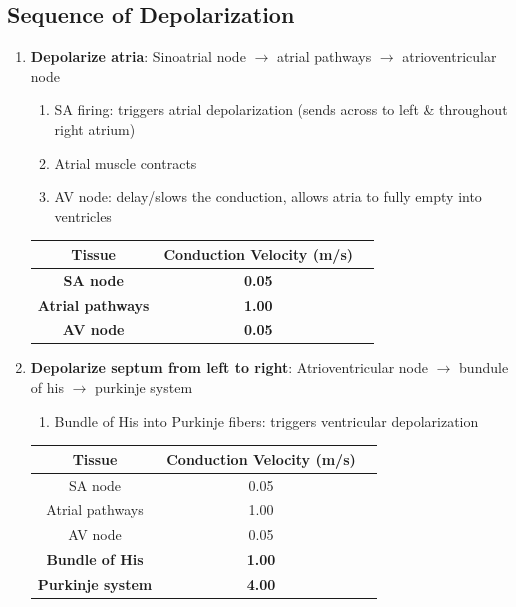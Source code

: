 \documentclass[11pt,fleqn]{book} %
\begin{document}
\subsection{Sequence of Depolarization}
\begin{enumerate}
    \item \textbf{Depolarize atria}: Sinoatrial node $\rightarrow$ atrial pathways $\rightarrow$ atrioventricular node
    \begin{enumerate}[start=1]
        \item SA firing: triggers atrial
depolarization (sends
across to left \& throughout
right atrium)
        \item Atrial muscle contracts
        \item AV node: delay/slows
the conduction, allows
atria to fully empty into
ventricles
    \end{enumerate}

\begin{tabular}{ccc}
\textbf{Tissue}  & \textbf{Conduction Velocity (m/s)} \\
\hline
\textbf{SA node}                                  & \textbf{0.05} \\
\textbf{Atrial pathways    }                      & \textbf{1.00} \\
\textbf{AV node     }                             & \textbf{0.05} 
\end{tabular}

    \item \textbf{Depolarize septum from left to right}: Atrioventricular node $\rightarrow$ bundule of his $\rightarrow$ purkinje system
    \begin{enumerate}[start=4]
        \item Bundle of His into
Purkinje fibers: triggers
ventricular
depolarization
    \end{enumerate}

\begin{tabular}{ccc}
\textbf{Tissue}  & \textbf{Conduction Velocity (m/s)} \\
\hline
SA node                                  & 0.05 \\
Atrial pathways                          & 1.00 \\
AV node                                  & 0.05 \\
\textbf{Bundle of His}&\textbf{1.00}\\
\textbf{Purkinje system}&\textbf{4.00}
\end{tabular}


\end{enumerate}
\end{document}
